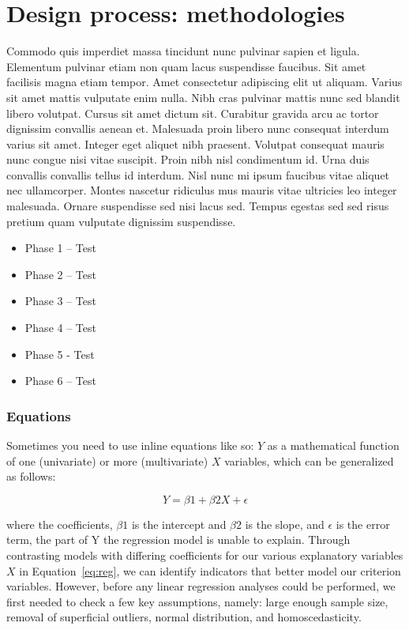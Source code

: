 
\chapter{Design process: methodologies}
\label{cha:methods}

Commodo quis imperdiet massa tincidunt nunc pulvinar sapien et ligula. Elementum pulvinar etiam non quam lacus suspendisse faucibus. Sit amet facilisis magna etiam tempor. Amet consectetur adipiscing elit ut aliquam. Varius sit amet mattis vulputate enim nulla. Nibh cras pulvinar mattis nunc sed blandit libero volutpat. Cursus sit amet dictum sit. Curabitur gravida arcu ac tortor dignissim convallis aenean et. Malesuada proin libero nunc consequat interdum varius sit amet. Integer eget aliquet nibh praesent. Volutpat consequat mauris nunc congue nisi vitae suscipit. Proin nibh nisl condimentum id. Urna duis convallis convallis tellus id interdum. Nisl nunc mi ipsum faucibus vitae aliquet nec ullamcorper. Montes nascetur ridiculus mus mauris vitae ultricies leo integer malesuada. Ornare suspendisse sed nisi lacus sed. Tempus egestas sed sed risus pretium quam vulputate dignissim suspendisse.


\begin{itemize}
\item Phase 1 – Test
\item Phase 2 – Test
\item Phase 3 – Test
\item Phase 4 – Test
\item Phase 5 - Test
\item Phase 6 – Test
\end{itemize}

\subsection{Equations}
\label{sec:eq}

Sometimes you need to use inline equations like so: $Y$ as a mathematical function of one (univariate) or more (multivariate) $X$ variables, which can be generalized as follows:

\begin{equation}
\label{eq:reg}
Y = \beta1 + \beta2X + \epsilon
\end{equation}


where the coefficients, $\beta1$ is the intercept and $\beta2$ is the slope, and $\epsilon$ is the error term, the part of Y the regression model is unable to explain. Through contrasting models with differing coefficients for our various explanatory variables $X$ in Equation~\ref{eq:reg}, we can identify indicators that better model our criterion variables. However, before any linear regression analyses could be performed, we first needed to check a few key assumptions, namely: large enough sample size, removal of superficial outliers, normal distribution, and homoscedasticity.

